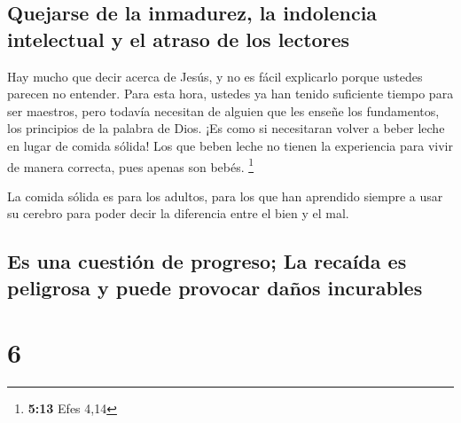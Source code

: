 \hypertarget{quejarse-de-la-inmadurez-la-indolencia-intelectual-y-el-atraso-de-los-lectores}{%
\subsection{Quejarse de la inmadurez, la indolencia intelectual y el
atraso de los
lectores}\label{quejarse-de-la-inmadurez-la-indolencia-intelectual-y-el-atraso-de-los-lectores}}

 Hay mucho que decir acerca de Jesús, y no es fácil
explicarlo porque ustedes parecen no entender.  Para esta
hora, ustedes ya han tenido suficiente tiempo para ser maestros, pero
todavía necesitan de alguien que les enseñe los fundamentos, los
principios de la palabra de Dios. ¡Es como si necesitaran volver a beber
leche en lugar de comida sólida!  Los que beben leche no
tienen la experiencia para vivir de manera correcta, pues apenas son
bebés. \footnote{\textbf{5:13} Efes 4,14}

 La comida sólida es para los adultos, para los que han
aprendido siempre a usar su cerebro para poder decir la diferencia entre
el bien y el mal.

\hypertarget{es-una-cuestiuxf3n-de-progreso-la-recauxedda-es-peligrosa-y-puede-provocar-dauxf1os-incurables}{%
\subsection{Es una cuestión de progreso; La recaída es peligrosa y puede
provocar daños
incurables}\label{es-una-cuestiuxf3n-de-progreso-la-recauxedda-es-peligrosa-y-puede-provocar-dauxf1os-incurables}}

\hypertarget{section-5}{%
\section{6}\label{section-5}}

